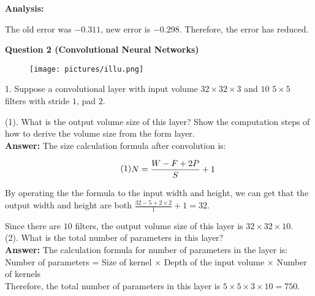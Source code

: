 \documentclass{article}
\begin{document}
\textbf{Analysis:}

The old error was $-0.311$, new error is $-0.298$. Therefore, the error has reduced.


\newpage



\noindent \textbf{Question 2 (Convolutional Neural Networks)} \\ 
\begin{figure}[tbh!]
\centering
\texttt{[image: pictures/illu.png]}
\end{figure}

1. Suppose a convolutional layer with input volume $32\times32\times3$ and $10$ $5\times 5$ filters with stride $1$, pad $2$. 

(1). What is the output volume size of this layer? Show the computation steps of how to derive the volume size from the form layer. \\

\textbf{Answer:} The size calculation formula after convolution is:

\begin{equation}{\tag{$1$}}
    \begin{aligned}
        N = \frac{W - F + 2P}{S} + 1
    \end{aligned}
\end{equation}

By operating the the formula to the input width and height, we can get that the output width and height are both $\frac{32 - 5 + 2\times 2}{1} + 1 = 32$. 

Since there are $10$ filters, the output volume size of this layer is $32 \times 32 \times 10$. \\


(2). What is the total number of parameters in this layer? \\

\textbf{Answer:} The calculation formula for number of parameters in the layer is: \\

Number of parameters = Size of kernel $\times$ Depth of the input volume $\times$ Number of kernels \\

Therefore, the total number of parameters in this layer is $5 \times 5 \times 3 \times 10 = 750$.

~\\
~\\
~\\
~\\
~\\
~\\
\end{document}
